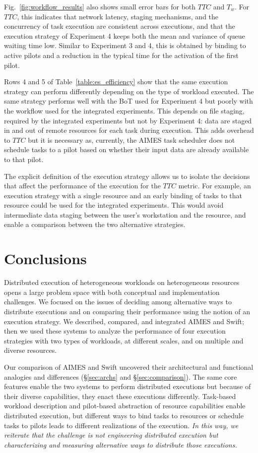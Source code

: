 \documentclass[10pt, conference, compsocconf]{IEEEtran}
\begin{document}
Fig.~\ref{fig:workflow_results} also shows small error bars for both \(TTC\)
and \(T_w\). For \(TTC\), this indicates that network latency, staging
mechanisms, and the concurrency of task execution are consistent across
executions, and that the execution strategy of Experiment 4 keeps both the
mean and variance of queue waiting time low. Similar to Experiment 3 and 4,
this is obtained by binding to active pilots and a reduction in the typical
time for the activation of the first pilot.

Rows 4 and 5 of Table~\ref{table:es_efficiency} show that the same execution
strategy can perform differently depending on the type of workload executed.
The same strategy performs well with the BoT used for Experiment 4 but poorly
with the workflow used for the integrated experiments. This depends on file
staging, required by the integrated experiments but not by Experiment 4: data
are staged in and out of remote resources for each task during execution.
This adds overhead to \(TTC\) but it is necessary as, currently, the AIMES
task scheduler does not schedule tasks to a pilot based on whether their
input data are already available to that pilot.

The explicit definition of the execution strategy allows us to isolate the
decisions that affect the performance of the execution for the \(TTC\)
metric. For example, an execution strategy with a single resource and an
early binding of tasks to that resource could be used for the integrated
experiments. This would avoid intermediate data staging between the user's
workstation and the resource, and enable a comparison between the two
alternative strategies.


\section{Conclusions}\label{sec:discussions}

Distributed execution of heterogeneous workloads on heterogeneous resources
opens a large problem space with both conceptual and implementation
challenges. We focused on the issues of deciding among alternative ways to
distribute executions and on comparing their performance using the notion of
an execution strategy. We described, compared, and integrated AIMES and
Swift; then we used these systems to analyze the performance of four
execution strategies with two types of workloads, at different scales, and on
multiple and diverse resources.

Our comparison of AIMES and Swift uncovered their architectural and
functional analogies and differences (\S\ref{sec:archs} and
\S\ref{sec:comparison}). The same core features enable the two systems to
perform distributed executions but because of their diverse capabilities,
they enact these executions differently. Task-based workload description and
pilot-based abstraction of resource capabilities enable distributed
execution, but different ways to bind tasks to resources or schedule tasks to
pilots leads to different realizations of the execution.  {\it In this way,
we reiterate that the challenge is not engineering distributed execution but
characterizing and measuring alternative ways to distribute those
executions.}
\end{document}
